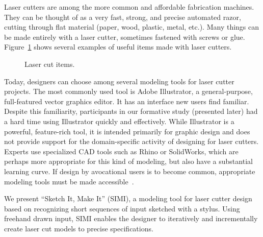 \documentclass{article}
\begin{document}
Laser cutters are among the more common and affordable fabrication
machines. They can be thought of as a very fast, strong, and precise
automated razor, cutting through flat material (paper, wood, plastic,
metal, etc.). Many things can be made entirely with a laser cutter,
sometimes fastened with screws or glue.
Figure~\ref{fig:laser-example} shows several examples of useful items
made with laser cutters.

\begin{figure}[b]
\centering 
{}
\caption{Laser cut items.}
\label{fig:laser-example}
\end{figure}

Today, designers can choose among several modeling tools for laser
cutter projects. The most commonly used tool is Adobe Illustrator, a
general-purpose, full-featured vector graphics editor. It has an
interface new users find familiar. Despite this familiarity,
participants in our formative study (presented later) had a hard time
using Illustrator quickly and effectively. While Illustrator is a
powerful, feature-rich tool, it is intended primarily for graphic
design and does not provide support for the domain-specific activity
of designing for laser cutters. Experts use specialized CAD tools such
as Rhino or SolidWorks, which are perhaps more appropriate for this
kind of modeling, but also have a substantial learning curve. If
design by avocational users is to become common, appropriate modeling
tools must be made accessible~\cite{lipson-homefactory}.

We present ``Sketch It, Make It'' (SIMI), a modeling tool for laser
cutter design based on recognizing short sequences of input sketched
with a stylus. Using freehand drawn input, SIMI enables the designer
to iteratively and incrementally create laser cut models to precise
specifications.
\end{document}
